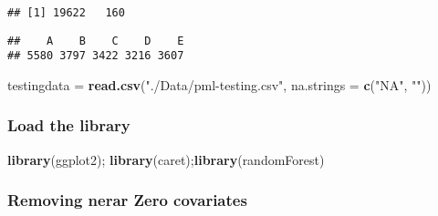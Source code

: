 \documentclass[]{article}
\newenvironment{Shaded}{\begin{snugshade}}{\end{snugshade}}
\newcommand{\KeywordTok}[1]{\textcolor[rgb]{0.13,0.29,0.53}{\textbf{{#1}}}}
\newcommand{\DataTypeTok}[1]{\textcolor[rgb]{0.13,0.29,0.53}{{#1}}}
\newcommand{\StringTok}[1]{\textcolor[rgb]{0.31,0.60,0.02}{{#1}}}
\newcommand{\OtherTok}[1]{\textcolor[rgb]{0.56,0.35,0.01}{{#1}}}
\newcommand{\NormalTok}[1]{{#1}}
\begin{document}
\begin{Shaded}
\end{Shaded}

\begin{verbatim}
## [1] 19622   160
\end{verbatim}

\begin{verbatim}
##    A    B    C    D    E 
## 5580 3797 3422 3216 3607
\end{verbatim}

\begin{Shaded}
\begin{Highlighting}[]
\NormalTok{testingdata =}\StringTok{ }\KeywordTok{read.csv}\NormalTok{(}\StringTok{"./Data/pml-testing.csv"}\NormalTok{, }\DataTypeTok{na.strings =} \KeywordTok{c}\NormalTok{(}\StringTok{"NA"}\NormalTok{, }\StringTok{""}\NormalTok{))}
\end{Highlighting}
\end{Shaded}

\subsubsection{Load the library}\label{load-the-library}

\begin{Shaded}
\begin{Highlighting}[]
\KeywordTok{library}\NormalTok{(ggplot2); }\KeywordTok{library}\NormalTok{(caret);}\KeywordTok{library}\NormalTok{(randomForest)}
\end{Highlighting}
\end{Shaded}

\subsubsection{Removing nerar Zero
covariates}\label{removing-nerar-zero-covariates}

\begin{Shaded}
\end{Shaded}
\end{document}
